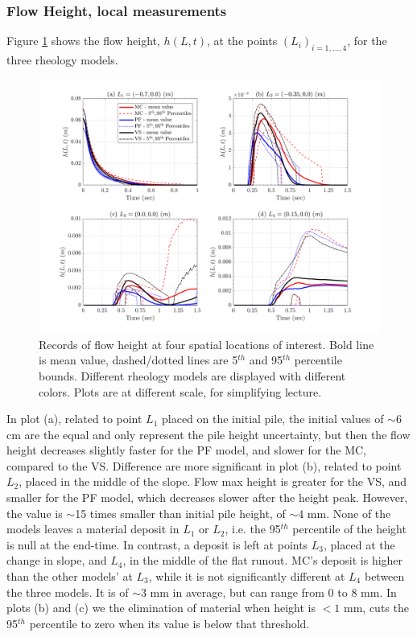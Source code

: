 \documentclass{article}
\begin{document}
\subsubsection{Flow Height, local measurements}
Figure \ref{fig:Ramp-H} shows the flow height, $h(L,t)$, at the points $(L_i)_{i=1,\dots,4}$, for the three rheology models.
\begin{figure}[H]
         \centering
        \includegraphics[width=1\textwidth]{NewTest/Height.png}
        \caption{Records of flow height at four spatial locations of interest. Bold line is mean value, dashed/dotted lines are 5$^{th}$ and 95$^{th}$ percentile bounds. Different rheology models are displayed with different colors. Plots are at different scale, for simplifying lecture.}
        \label{fig:Ramp-H}
\end{figure}
In plot (a), related to point $L_1$ placed on the initial pile, the initial values of $\sim 6$ cm are the equal and only represent the pile height uncertainty, but then the flow height decreases slightly faster for the PF model, and slower for the MC, compared to the VS. Difference are more significant in plot (b), related to point $L_2$, placed in the middle of the slope. Flow max height is greater for the VS, and smaller for the PF model, which decreases slower after the height peak. However, the value is $\sim$15 times smaller than initial pile height, of $\sim 4$ mm. None of the models leaves a material deposit in $L_1$ or $L_2$, i.e. the 95$^{th}$ percentile of the height is null at the end-time. In contrast, a deposit is left at points $L_3$, placed at the change in slope, and $L_4$, in the middle of the flat runout. MC's deposit is higher than the other models' at $L_3$, while it is not significantly different at $L_4$ between the three models. It is of $\sim 3$ mm in average, but can range from $0$ to $8$ mm. In plots (b) and (c) we the elimination of material when height is $<1$ mm, cuts the 95$^{th}$ percentile to zero when its value is below that threshold.
\end{document}

